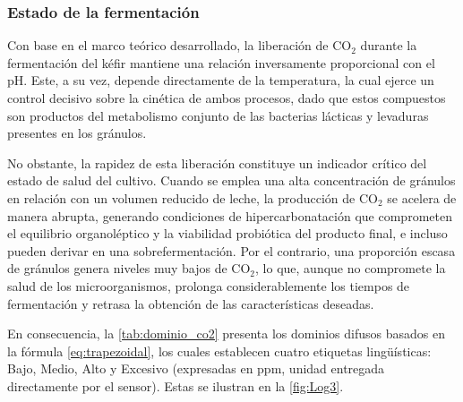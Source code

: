 \subsubsection{Estado de la fermentación}

Con base en el marco teórico desarrollado, la liberación de $\text{CO}_2$ durante la fermentación del
kéfir mantiene una relación inversamente proporcional con el pH. Este, a su vez, 
depende directamente de la temperatura, la cual ejerce un control decisivo sobre la cinética de 
ambos procesos, dado que estos compuestos son productos del metabolismo 
conjunto de las bacterias lácticas y levaduras presentes en los gránulos.

No obstante, la rapidez de esta liberación constituye un indicador crítico del estado de salud del 
cultivo. Cuando se emplea una alta concentración de gránulos en relación con un volumen reducido de leche, 
la producción de $\text{CO}_2$ se acelera de manera abrupta, generando condiciones de hipercarbonatación que 
comprometen el equilibrio organoléptico y la viabilidad probiótica del producto final, e incluso pueden 
derivar en una sobrefermentación. Por el contrario, una proporción escasa de 
gránulos genera niveles muy bajos de $\text{CO}_2$, lo que, aunque no compromete la salud de los microorganismos, 
prolonga considerablemente los tiempos de fermentación y retrasa la obtención de las características 
deseadas.

En consecuencia, la \cref{tab:dominio_co2} presenta los dominios difusos basados en la fórmula \eqref{eq:trapezoidal}, 
los cuales establecen cuatro etiquetas lingüísticas: Bajo, Medio, Alto y 
Excesivo (expresadas en ppm, unidad entregada directamente por el sensor). Estas se ilustran en la \cref{fig:Log3}.

